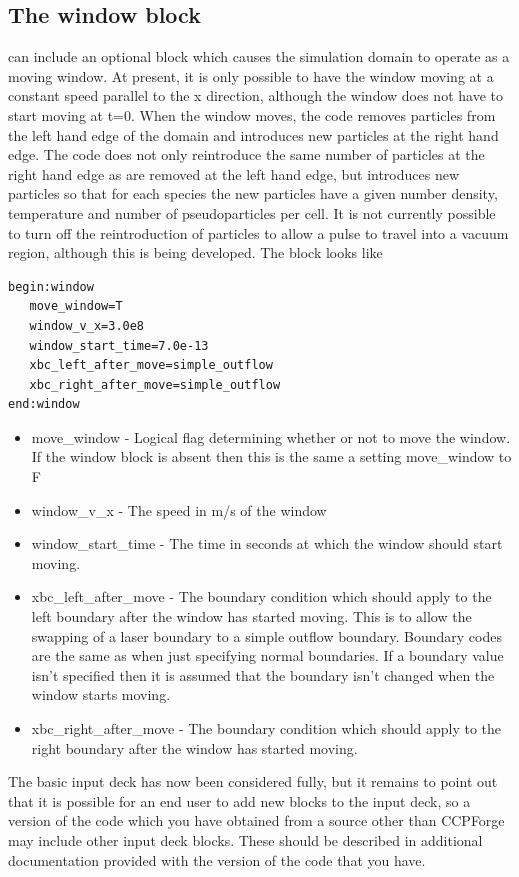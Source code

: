\documentclass[12pt,a4paper]{article}
\newcommand{\simpleboxverbatim}{\begin{Verbatim}[obeytabs=true,frame=single,
  framerule=0.5mm,rulecolor=\color{warwickmid},formatcom=\color{black}]}
\newcommand{\EPOCH}{{\color{warwickdark}\fontfamily{phv}\selectfont{EPOCH}}}
\begin{document}
\subsection{The window block}
{\EPOCH} can include an optional block which causes the simulation domain to
operate as a moving window. At present, it is only possible to have the window
moving at a constant speed parallel to the x direction, although the window
does not have to start moving at t=0. When the window moves, the code removes
particles from the left hand edge of the domain and introduces new particles
at the right hand edge. The code does not only reintroduce the same number of
particles at the right hand edge as are removed at the left hand edge, but
introduces new particles so that for each species the new particles have a
given number density, temperature and number of pseudoparticles per cell. It
is not currently possible to turn off the reintroduction of particles to allow
a pulse to travel into a vacuum region, although this is being developed. The
block looks like\\
\simpleboxverbatim
begin:window
   move_window=T
   window_v_x=3.0e8
   window_start_time=7.0e-13
   xbc_left_after_move=simple_outflow
   xbc_right_after_move=simple_outflow
end:window
\end{Verbatim}

\begin{itemize}
\item move\_window - Logical flag determining whether or not to move the
  window. If the window block is absent then this is the same a setting
  move\_window to F
\item window\_v\_x - The speed in m/s of the window
\item window\_start\_time - The time in seconds at which the window should
  start moving.
\item xbc\_left\_after\_move - The boundary condition which should apply to
  the left boundary after the window has started moving. This is to allow the
  swapping of a laser boundary to a simple outflow boundary. Boundary codes
  are the same as when just specifying normal boundaries. If a boundary value
  isn't specified then it is assumed that the boundary isn't changed when the
  window starts moving.
\item xbc\_right\_after\_move - The boundary condition which should apply to
  the right boundary after the window has started moving.
\end{itemize}

The basic input deck has now been considered fully, but it remains to point
out that it is possible for an end user to add new blocks to the input deck,
so a version of the code which you have obtained from a source other than
CCPForge may include other input deck blocks. These should be described in
additional documentation provided with the version of the code that you have.
\end{document}
